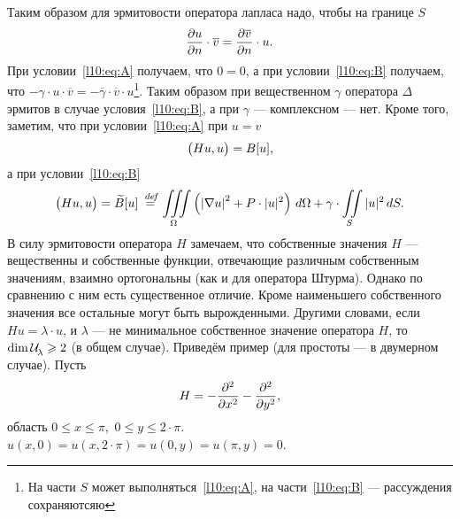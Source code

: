 \documentclass[12pt,a4paper,openany,fleqn]{book}
\newcommand {\defeq}{\stackrel{\hspace{0.09 cm}de\!f}{=}}
\newcommand {\eqdef}{\defeq}
\newcommand{\mc}[1]{\ensuremath{\mathcal{#1}}}
\newcommand{\pder}[2]{\ensuremath{\frac{\partial#1}{\partial#2}}}
\newcommand{\pdder}[2]{\ensuremath{\frac{\partial^2#1}{\partial#2^2}}}
\newcommand{\Ul}[1][\lambda]{\ensuremath{\mc{U}\!{\mathstrut}_{#1}}}
\theoremstyle{definition}
\begin{document}
	Таким образом для эрмитовости оператора лапласа надо, чтобы на границе $S$
	\begin{equation*}
		\hfill\pder{u}{n}\cdot\overline{v}=\pder{\overline{v}}{n}\cdot u.\hfill
	\end{equation*}
	При условии~\eqref{l10:eq:A} получаем, что $0=0$, а при условии~\eqref{l10:eq:B} получаем, что $-\gamma\cdot u\cdot\overline{v}=-\overline{\gamma}\cdot\overline{v}\cdot u$\footnote{На части $S$ может выполняться~\eqref{l10:eq:A}, на части~\eqref{l10:eq:B} --- рассуждения сохраняютсяю}. Таким образом при вещественном $\gamma$ оператора $\Delta$ эрмитов в случае условия~\eqref{l10:eq:B}, а при $\gamma$ --- комплексном --- нет. Кроме того, заметим, что при условии~\eqref{l10:eq:A} при $u=v$
	\begin{equation}\label{l10:eq:7}
		\hfill\big(Hu,u\big)=B[u],\hfill
	\end{equation} 
	а при условии~\eqref{l10:eq:B}
	\begin{equation}\label{l10:eq:8}
		\hfill\big(Hu,u\big)=\widetilde{B}[u]\eqdef\iiint\limits_{\Omega}\left(\left|\nabla u\right|^2+P\cdot|u|^2\right)\,d\Omega+\gamma\cdot\iint\limits_{S}|u|^2\,dS.\hfill
	\end{equation}
	В силу эрмитовости оператора $H$ замечаем, что собственные значения $H$ --- вещественны и собственные функции, отвечающие различным собственным значениям, взаимно ортогональны (как и для оператора Штурма). Однако по сравнению с ним есть существенное отличие. Кроме наименьшего собственного значения все остальные могут быть вырожденными. Другими словами, если $Hu=\lambda\cdot u$, и $\lambda$ --- не минимальное собственное значение оператора $H$, то $\dim\Ul\geqslant2$ (в общем случае). Приведём пример (для простоты --- в двумерном случае). Пусть
	\begin{equation*}
		\hfill H=-\pdder{}{x}-\pdder{}{y},\hfill
	\end{equation*}
	область $0\leqslant x\leqslant\pi$,\ $0\leqslant y\leqslant 2\cdot\pi$. $u(x,0)=u(x,2\cdot\pi)=u(0,y)=u(\pi,y)=0$.
	
	
\end{document}
